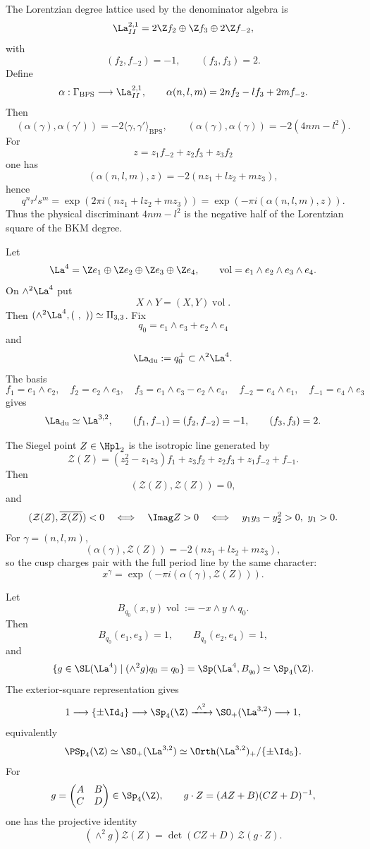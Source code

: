 The Lorentzian degree lattice used by the denominator algebra is
$$
\La^{2,1}_{II}
=2\Z f_2\oplus \Z f_3\oplus 2\Z f_{-2},
$$
with
$$
(f_2,f_{-2})=-1,\qquad (f_3,f_3)=2.
$$
Define
$$
\alpha:\Gamma_{\mathrm{BPS}}\longrightarrow\La^{2,1}_{II},
\qquad
\alpha(n,l,m)=2nf_2-lf_3+2mf_{-2}.
$$
Then
$$
(\alpha(\gamma),\alpha(\gamma'))
=-2\langle\gamma,\gamma'\rangle_{\mathrm{BPS}},
\qquad
(\alpha(\gamma),\alpha(\gamma))=-2(4nm-l^2).
$$
For
$$
z=z_1f_{-2}+z_2f_3+z_3f_2
$$
one has
$$
(\alpha(n,l,m),z)=-2(nz_1+lz_2+mz_3),
$$
hence
$$
q^nr^ls^m
=\exp(2\pi i(nz_1+lz_2+mz_3))
=\exp(-\pi i(\alpha(n,l,m),z)).
$$
Thus the physical discriminant $4nm-l^2$ is the negative half of the
Lorentzian square of the BKM degree.

\begin{definition}
Let
$$
\La^4=\Z e_1\oplus\Z e_2\oplus\Z e_3\oplus\Z e_4,
\qquad
\operatorname{vol}=e_1\wedge e_2\wedge e_3\wedge e_4.
$$
On $\wedge^2\La^4$ put
$$
X\wedge Y=(X,Y)\operatorname{vol}.
$$
Then $(\wedge^2\La^4,(\ ,\ ))\simeq \mathrm{II}_{3,3}$.
Fix
$$
q_0=e_1\wedge e_3+e_2\wedge e_4
$$
and
$$
\La_{\mathrm{du}}
:=q_0^\perp\subset\wedge^2\La^4.
$$
The basis
$$
f_1=e_1\wedge e_2,\quad
f_2=e_2\wedge e_3,\quad
f_3=e_1\wedge e_3-e_2\wedge e_4,\quad
f_{-2}=e_4\wedge e_1,\quad
f_{-1}=e_4\wedge e_3
$$
gives
$$
\La_{\mathrm{du}}\simeq\La^{3,2},\qquad
(f_1,f_{-1})=(f_2,f_{-2})=-1,\qquad (f_3,f_3)=2.
$$
\end{definition}

The Siegel point $Z\in\Hpl_2$ is the isotropic line generated by
$$
\mathcal Z(Z)
=(z_2^2-z_1z_3)f_1+z_3f_2+z_2f_3+z_1f_{-2}+f_{-1}.
$$
Then
$$
(\mathcal Z(Z),\mathcal Z(Z))=0,
$$
and
$$
(\mathcal Z(Z),\overline{\mathcal Z(Z)})<0
\quad\Longleftrightarrow\quad
\Imag Z>0
\quad\Longleftrightarrow\quad
y_1y_3-y_2^2>0,\ y_1>0.
$$
For $\gamma=(n,l,m)$,
$$
(\alpha(\gamma),\mathcal Z(Z))
=-2(nz_1+lz_2+mz_3),
$$
so the cusp charges pair with the full period line by the same
character:
$$
x^\gamma=\exp(-\pi i(\alpha(\gamma),\mathcal Z(Z))).
$$

\begin{theorem}
\label{thm:duality-wedge-square}
Let
$$
B_{q_0}(x,y)\operatorname{vol}:=-x\wedge y\wedge q_0.
$$
Then
$$
B_{q_0}(e_1,e_3)=1,\qquad B_{q_0}(e_2,e_4)=1,
$$
and
$$
\{g\in\SL(\La^4)\mid (\wedge^2g)q_0=q_0\}
=\Sp(\La^4,B_{q_0})\simeq\Sp_4(\Z).
$$
The exterior-square representation gives
$$
1\longrightarrow\{\pm\Id_4\}
\longrightarrow\Sp_4(\Z)
\xrightarrow{\ \wedge^2\ }
\SO_+(\La^{3,2})
\longrightarrow 1,
$$
equivalently
$$
\PSp_4(\Z)\simeq\SO_+(\La^{3,2})
\simeq\Orth(\La^{3,2})_+/\{\pm\Id_5\}.
$$
For
$$
g=\begin{pmatrix}A&B\\ C&D\end{pmatrix}\in\Sp_4(\Z),
\qquad
g\cdot Z=(AZ+B)(CZ+D)^{-1},
$$
one has the projective identity
$$
(\wedge^2g)\mathcal Z(Z)
=\det(CZ+D)\,\mathcal Z(g\cdot Z).
$$
\end{theorem}

